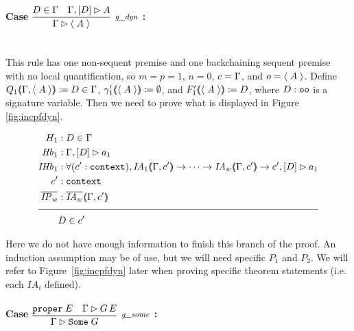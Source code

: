 \paragraph{Case $\vcenter{\rlsinit{}}$ :} ~\\

This rule has one non-sequent premise and one backchaining sequent premise with no local quantification, so $m = p = 1$, $n = 0$, $c = \Gamma{}$, and $o = \langle \; A \; \rangle$. Define $Q_1 (\hspace{-0.35em} \langle \Gamma{} , \langle \; A \; \rangle \rangle \hspace{-0.35em}) \coloneqq D \in \Gamma{}$, $\gamma'_1 (\hspace{-0.35em} \langle \langle \; A \; \rangle \rangle \hspace{-0.35em}) \coloneqq \emptyset$, and $F'_1 (\hspace{-0.35em} \langle \langle \; A \; \rangle \rangle \hspace{-0.35em}) \coloneqq D$, where $D : \texttt{oo}$ is a signature variable. Then we need to prove what is displayed in Figure \ref{fig:incpfdyn}.
\begin{figure}
\begin{align*}
H_1 &: D \in \dyncon{} \\
\mathit{Hb}_1 &: \bchsl{D}{a_1} \\
\mathit{IHb}_1 &: \forall (\inddyncon{} : \sltm{context}), \mathit{IA}_1 \args{\dyncon{} , \inddyncon{}} \rightarrow \dots \rightarrow \mathit{IA}_w \args{\dyncon{} , \inddyncon{}} \rightarrow \bchsl[\inddyncon{}]{D}{a_1} \\
\inddyncon{} &: \sltm{context} \\
\ol{\mathit{IP}_w} &: \ol{\mathit{IA}_w} \args{\dyncon{} , \inddyncon{}} \\[\pfshift{}]
\cline{1-2}
& D \in \inddyncon{}
\end{align*}
\end{figure}
Here we do not have enough information to finish this branch of the proof. An induction assumption may be of use, but we will need specific $P_1$ and $P_2$. We will refer to Figure~\ref{fig:incpfdyn} later when proving specific theorem statements (i.e. each $\mathit{IA}_i$ defined).

\paragraph{Case $\vcenter{\rlssome{}}$ :} ~\\

